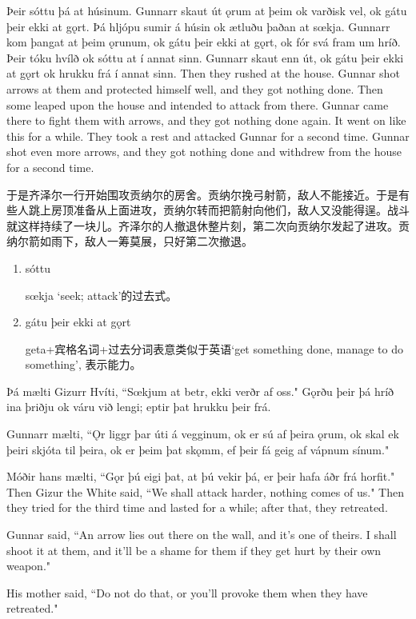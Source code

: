 \begin{paracol}{2}
  Þeir sóttu þá at húsinum. Gunnarr skaut út ǫrum at þeim ok varðisk vel, ok gátu þeir ekki at gǫrt. Þá hljópu sumir á húsin ok ætluðu þaðan at sœkja. Gunnarr kom þangat at þeim ǫrunum, ok gátu þeir ekki at gǫrt, ok fór svá fram um hríð. Þeir tóku hvílð ok sóttu at í annat sinn. Gunnarr skaut enn út, ok gátu þeir ekki at gǫrt ok hrukku frá í annat sinn.
  \switchcolumn
  Then they rushed at the house. Gunnar shot arrows at them and protected himself well, and they got nothing done. Then some leaped upon the house and intended to attack from there. Gunnar came there to fight them with arrows, and they got nothing done again. It went on like this for a while. They took a rest and attacked Gunnar for a second time. Gunnar shot even more arrows, and they got nothing done and withdrew from the house for a second time.
\end{paracol}
\begin{translation*}{}
  于是齐泽尔一行开始围攻贡纳尔的房舍。贡纳尔挽弓射箭，敌人不能接近。于是有些人跳上房顶准备从上面进攻，贡纳尔转而把箭射向他们，敌人又没能得逞。战斗就这样持续了一块儿。齐泽尔的人撤退休整片刻，第二次向贡纳尔发起了进攻。贡纳尔箭如雨下，敌人一筹莫展，只好第二次撤退。
\end{translation*}
\begin{grammar*}{}
  \begin{enumerate}[leftmargin=*]
    \item sóttu

          sœkja `seek; attack'的过去式。

    \item gátu þeir ekki at gǫrt

          geta+宾格名词+过去分词表意类似于英语`get something done, manage to do something', 表示能力。
  \end{enumerate}
\end{grammar*}
\begin{paracol}{2}
  Þá mælti Gizurr Hvíti, ``Sœkjum at betr, ekki verðr af oss." Gǫrðu þeir þá hríð ina þriðju ok váru við lengi; eptir þat hrukku þeir frá.

  Gunnarr mælti, ``Ǫr liggr þar úti á vegginum, ok er sú af þeira ǫrum, ok skal ek þeiri skjóta til þeira, ok er þeim þat skǫmm, ef þeir fá geig af vápnum sínum."

  Móðir hans mælti, ``Gǫr þú eigi þat, at þú vekir þá, er þeir hafa áðr frá horfit."
  \switchcolumn
  Then Gizur the White said, ``We shall attack harder, nothing comes of us." Then they tried for the third time and lasted for a while; after that, they retreated.

  Gunnar said, ``An arrow lies out there on the wall, and it's one of theirs. I shall shoot it at them, and it'll be a shame for them if they get hurt by their own weapon."

  His mother said, ``Do not do that, or you'll provoke them when they have retreated."
\end{paracol}
